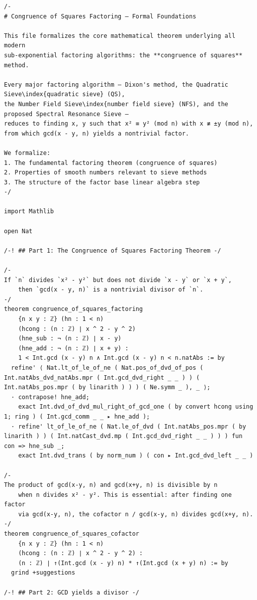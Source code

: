 \documentclass[11pt,openany]{book}
\theoremstyle{definition}
\theoremstyle{plain}
\theoremstyle{remark}
\begin{document}
\begin{lstlisting}[style=lean]
/-
# Congruence of Squares Factoring — Formal Foundations

This file formalizes the core mathematical theorem underlying all modern
sub-exponential factoring algorithms: the **congruence of squares** method.

Every major factoring algorithm — Dixon's method, the Quadratic Sieve\index{quadratic sieve} (QS),
the Number Field Sieve\index{number field sieve} (NFS), and the proposed Spectral Resonance Sieve —
reduces to finding x, y such that x² ≡ y² (mod n) with x ≢ ±y (mod n),
from which gcd(x - y, n) yields a nontrivial factor.

We formalize:
1. The fundamental factoring theorem (congruence of squares)
2. Properties of smooth numbers relevant to sieve methods
3. The structure of the factor base linear algebra step
-/

import Mathlib

open Nat

/-! ## Part 1: The Congruence of Squares Factoring Theorem -/

/-
If `n` divides `x² - y²` but does not divide `x - y` or `x + y`,
    then `gcd(x - y, n)` is a nontrivial divisor of `n`.
-/
theorem congruence_of_squares_factoring
    {n x y : ℤ} (hn : 1 < n)
    (hcong : (n : ℤ) ∣ x ^ 2 - y ^ 2)
    (hne_sub : ¬ (n : ℤ) ∣ x - y)
    (hne_add : ¬ (n : ℤ) ∣ x + y) :
    1 < Int.gcd (x - y) n ∧ Int.gcd (x - y) n < n.natAbs := by
  refine' ⟨ Nat.lt_of_le_of_ne ( Nat.pos_of_dvd_of_pos ( Int.natAbs_dvd_natAbs.mpr ( Int.gcd_dvd_right _ _ ) ) ( Int.natAbs_pos.mpr ( by linarith ) ) ) ( Ne.symm _ ), _ ⟩;
  · contrapose! hne_add;
    exact Int.dvd_of_dvd_mul_right_of_gcd_one ( by convert hcong using 1; ring ) ( Int.gcd_comm _ _ ▸ hne_add );
  · refine' lt_of_le_of_ne ( Nat.le_of_dvd ( Int.natAbs_pos.mpr ( by linarith ) ) ( Int.natCast_dvd.mp ( Int.gcd_dvd_right _ _ ) ) ) fun con => hne_sub _;
    exact Int.dvd_trans ( by norm_num ) ( con ▸ Int.gcd_dvd_left _ _ )

/-
The product of gcd(x-y, n) and gcd(x+y, n) is divisible by n
    when n divides x² - y². This is essential: after finding one factor
    via gcd(x-y, n), the cofactor n / gcd(x-y, n) divides gcd(x+y, n).
-/
theorem congruence_of_squares_cofactor
    {n x y : ℤ} (hn : 1 < n)
    (hcong : (n : ℤ) ∣ x ^ 2 - y ^ 2) :
    (n : ℤ) ∣ ↑(Int.gcd (x - y) n) * ↑(Int.gcd (x + y) n) := by
  grind +suggestions

/-! ## Part 2: GCD yields a divisor -/


\end{lstlisting}
\end{document}

